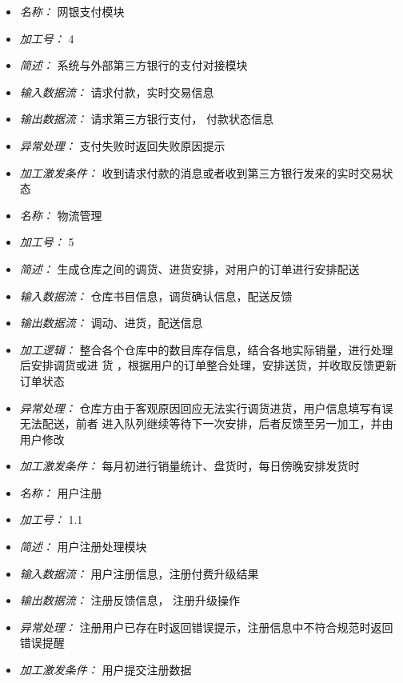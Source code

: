 \vspace{-1mm}


\begin{itemize}
\item \textit{名称： } 网银支付模块
\item \textit{加工号： }4
\item \textit{简述： } 系统与外部第三方银行的支付对接模块
\item \textit{输入数据流： } 请求付款，实时交易信息
\item \textit{输出数据流： } 请求第三方银行支付， 付款状态信息
\item \textit{异常处理： } 支付失败时返回失败原因提示
\item \textit{加工激发条件： } 收到请求付款的消息或者收到第三方银行发来的实时交易状态

\end{itemize}


\vspace{-1mm}


\begin{itemize}
\item \textit{名称： }物流管理
\item \textit{加工号： }5
\item \textit{简述： }生成仓库之间的调货、进货安排，对用户的订单进行安排配送
\item \textit{输入数据流： } 仓库书目信息，调货确认信息，配送反馈 
\item \textit{输出数据流： }调动、进货，配送信息 
\item \textit{加工逻辑： }整合各个仓库中的数目库存信息，结合各地实际销量，进行处理后安排调货或进 货 ，根据用户的订单整合处理，安排送货，并收取反馈更新订单状态 
\item \textit{异常处理： }仓库方由于客观原因回应无法实行调货进货，用户信息填写有误无法配送，前者 进入队列继续等待下一次安排，后者反馈至另一加工，并由用户修改 
\item \textit{加工激发条件： }每月初进行销量统计、盘货时，每日傍晚安排发货时

\end{itemize}


\vspace{-1mm}


\begin{itemize}
\item \textit{名称： } 用户注册
\item \textit{加工号： } 1.1
\item \textit{简述： } 用户注册处理模块
\item \textit{输入数据流： } 用户注册信息，注册付费升级结果
\item \textit{输出数据流： } 注册反馈信息， 注册升级操作
\item \textit{异常处理： } 注册用户已存在时返回错误提示，注册信息中不符合规范时返回错误提醒 
\item \textit{加工激发条件： } 用户提交注册数据

\end{itemize}


